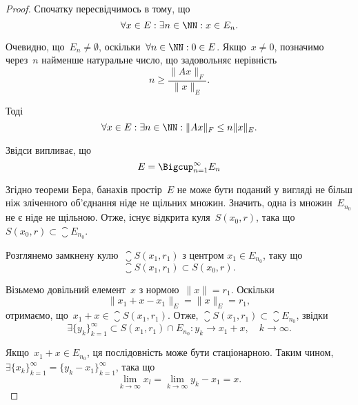 \begin{proof}
Спочатку пересвідчимось в тому, що
\begin{equation*}
    \forall x \in E: \exists n \in \NN: x \in E_n.
\end{equation*}

Очевидно, що~$E_n \ne \emptyset$, оскільки~$\forall n \in \NN: 0 \in E$.
Якщо~$x \ne 0$, позначимо через~$n$ найменше натуральне число, що
задовольняє нерівність
\begin{equation*}
    n \ge \frac{\|A x\|_F}{\|x\|_E}.
\end{equation*}

Тоді
\begin{equation*}
    \forall x \in E: \exists n \in \NN: \|Ax\|_F \le n \|x\|_E.
\end{equation*}

Звідси випливає, що
\begin{equation*}
    E = \Bigcup_{n = 1}^\infty E_n
\end{equation*}

Згідно теореми Бера, банахів простір~$E$ не може бути
поданий у вигляді не більш ніж зліченного об’єднання ніде
не щільних множин. Значить, одна із множин~$E_{n_0}$ не є ніде
не щільною. Отже, існує відкрита куля~$S(x_0, r)$, така що
$S(x_0, r) \subset \closure E_{n_0}$.

Розглянемо замкнену кулю~$\closure S(x_1, r_1)$ з центром
$x_1 \in E_{n_0}$, таку що
\begin{equation*}
    \closure S(x_1, r_1) \subset S(x_0, r).
\end{equation*}

Візьмемо довільний елемент~$x$ з нормою~$\|x\| = r_1$. Оскільки
\begin{equation*}
    \|x_1 + x - x_1\|_E = \|x\|_E = r_1,
\end{equation*}
отримаємо, що~$x_1 + x \in \closure S(x_1, r_1)$. Отже,
$\closure S(x_1, r_1) \subset \closure E_{n_0}$, звідки
\begin{equation*}
    \exists \{y_k\}_{k = 1}^\infty \subset S(x_1, r_1) \cap E_{n_0}:
    y_k \to x_1 + x, \quad k \to \infty.
\end{equation*}

Якщо~$x_1 + x \in E_{n_0}$, ця послідовність може бути стаціонарною.
Таким чином, $\exists \{x_k\}_{k = 1}^\infty = \{y_k - x_1\}_{k = 1}^\infty$, така
що
\begin{equation*}
    \lim_{k \to \infty} x_l = \lim_{k \to \infty} y_k - x_1 = x.
\end{equation*}


\end{proof}
